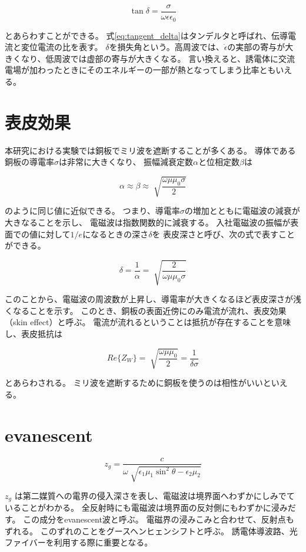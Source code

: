 \documentclass[a4paper,11pt]{jsarticle}
\begin{document}
\begin{equation} \label{eq:tangent_delta}
  \tan \delta = \frac{\sigma}{\omega\epsilon\epsilon_0}
\end{equation}

とあらわすことができる。
式\ref{eq:tangent_delta}はタンデルタと呼ばれ、伝導電流と変位電流の比を表す。
$\delta$を損失角という。高周波では、$\dot{\epsilon}$の実部の寄与が大きくなり、低周波では虚部の寄与が大きくなる。
言い換えると、誘電体に交流電場が加わったときにそのエネルギーの一部が熱となってしまう比率ともいえる。

\section{表皮効果}

本研究における実験では銅板でミリ波を遮断することが多くある。
導体である銅板の導電率$\sigma$は非常に大きくなり、
振幅減衰定数$\alpha$と位相定数$\beta$は

\begin{equation}
  \alpha \approx \beta \approx \sqrt[]{\frac{\omega\mu\mu_0\sigma}{2}}
\end{equation}

のように同じ値に近似できる。
つまり、導電率$\sigma$の増加とともに電磁波の減衰が大きなることを示し、
電磁波は指数関数的に減衰する。
入社電磁波の振幅が表面での値に対して$1/e$になるときの深さ$\delta$を
表皮深さと呼び、次の式で表すことができる。

\begin{equation}
  \delta = \frac{1}{\alpha} = \sqrt[]{\frac{2}{\omega\mu\mu_0\sigma}}
\end{equation}

このことから、電磁波の周波数が上昇し、導電率が大きくなるほど表皮深さが浅くなることを示す。
このとき、銅板の表面近傍にのみ電流が流れ、表皮効果（skin effect）と呼ぶ。
電流が流れるということは抵抗が存在することを意味し、表皮抵抗は

\begin{equation}
  Re\{Z_W\} = \sqrt[]{\frac{\omega\mu\mu_0}{2}} = \frac{1}{\delta\sigma}
\end{equation}

とあらわされる。
ミリ波を遮断するために銅板を使うのは相性がいいといえる。

\section{evanescent}

\begin{equation}
  z_g = \frac{c}{\omega\sqrt[]{\epsilon_1\mu_1\sin^{2}\theta - \epsilon_2\mu_2}}
\end{equation}

$z_g$ は第二媒質への電界の侵入深さを表し、電磁波は境界面へわずかにしみでていることがわかる。
全反射時にも電磁波は境界面の反対側にもわずかに浸みだす。
この成分をevanescent波と呼ぶ。
電磁界の浸みこみと合わせて、反射点もずれる。
このずれのことをグースヘンヒェンシフトと呼ぶ。
誘電体導波路、光ファイバーを利用する際に重要となる。　
\end{document}
